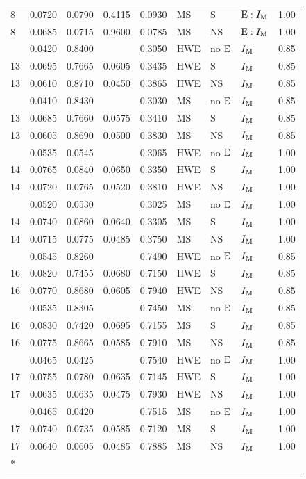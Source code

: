\begin{longtable}[t]{lllllllll}
8 & 0.0720 & 0.0790 & 0.4115 & 0.0930 & MS & S & ${\rm E}:I_{{\rm M}}$ & 1.00\\
8 & 0.0685 & 0.0715 & 0.9600 & 0.0785 & MS & NS & ${\rm E}:I_{{\rm M}}$ & 1.00\\
\addlinespace
13 & 0.0420 & 0.8400 &  & 0.3050 & HWE & no ${\rm E}$ & $I_{{\rm M}}$ & 0.85\\
13 & 0.0695 & 0.7665 & 0.0605 & 0.3435 & HWE & S & $I_{{\rm M}}$ & 0.85\\
13 & 0.0610 & 0.8710 & 0.0450 & 0.3865 & HWE & NS & $I_{{\rm M}}$ & 0.85\\
\addlinespace
13 & 0.0410 & 0.8430 &  & 0.3030 & MS & no ${\rm E}$ & $I_{{\rm M}}$ & 0.85\\
13 & 0.0685 & 0.7660 & 0.0575 & 0.3410 & MS & S & $I_{{\rm M}}$ & 0.85\\
13 & 0.0605 & 0.8690 & 0.0500 & 0.3830 & MS & NS & $I_{{\rm M}}$ & 0.85\\
\addlinespace
14 & 0.0535 & 0.0545 &  & 0.3065 & HWE & no ${\rm E}$ & $I_{{\rm M}}$ & 1.00\\
14 & 0.0765 & 0.0840 & 0.0650 & 0.3350 & HWE & S & $I_{{\rm M}}$ & 1.00\\
14 & 0.0720 & 0.0765 & 0.0520 & 0.3810 & HWE & NS & $I_{{\rm M}}$ & 1.00\\
\addlinespace
14 & 0.0520 & 0.0530 &  & 0.3025 & MS & no ${\rm E}$ & $I_{{\rm M}}$ & 1.00\\
14 & 0.0740 & 0.0860 & 0.0640 & 0.3305 & MS & S & $I_{{\rm M}}$ & 1.00\\
14 & 0.0715 & 0.0775 & 0.0485 & 0.3750 & MS & NS & $I_{{\rm M}}$ & 1.00\\
\addlinespace
16 & 0.0545 & 0.8260 &  & 0.7490 & HWE & no ${\rm E}$ & $I_{{\rm M}}$ & 0.85\\
16 & 0.0820 & 0.7455 & 0.0680 & 0.7150 & HWE & S & $I_{{\rm M}}$ & 0.85\\
16 & 0.0770 & 0.8680 & 0.0605 & 0.7940 & HWE & NS & $I_{{\rm M}}$ & 0.85\\
\addlinespace
16 & 0.0535 & 0.8305 &  & 0.7450 & MS & no ${\rm E}$ & $I_{{\rm M}}$ & 0.85\\
16 & 0.0830 & 0.7420 & 0.0695 & 0.7155 & MS & S & $I_{{\rm M}}$ & 0.85\\
16 & 0.0775 & 0.8665 & 0.0585 & 0.7910 & MS & NS & $I_{{\rm M}}$ & 0.85\\
\addlinespace
17 & 0.0465 & 0.0425 &  & 0.7540 & HWE & no ${\rm E}$ & $I_{{\rm M}}$ & 1.00\\
17 & 0.0755 & 0.0780 & 0.0635 & 0.7145 & HWE & S & $I_{{\rm M}}$ & 1.00\\
17 & 0.0635 & 0.0635 & 0.0475 & 0.7930 & HWE & NS & $I_{{\rm M}}$ & 1.00\\
\addlinespace
17 & 0.0465 & 0.0420 &  & 0.7515 & MS & no ${\rm E}$ & $I_{{\rm M}}$ & 1.00\\
17 & 0.0740 & 0.0735 & 0.0585 & 0.7120 & MS & S & $I_{{\rm M}}$ & 1.00\\
17 & 0.0640 & 0.0605 & 0.0485 & 0.7885 & MS & NS & $I_{{\rm M}}$ & 1.00\\*
\end{longtable}
